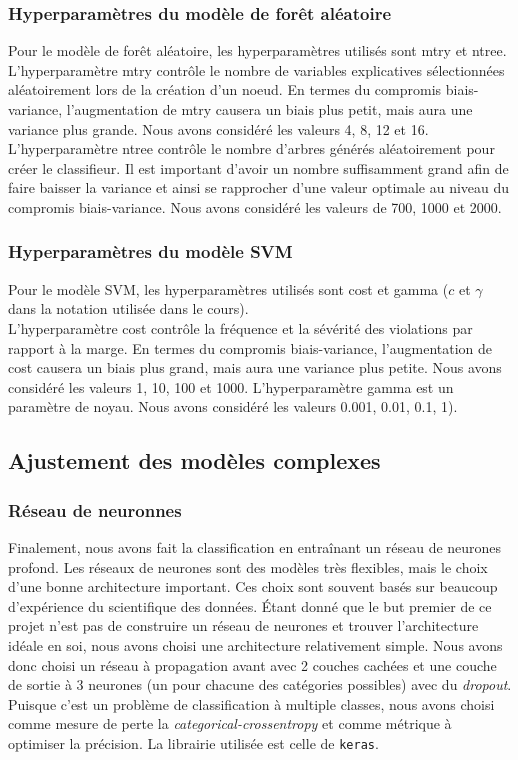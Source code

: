 \subsubsection{Hyperparamètres du modèle de forêt aléatoire}
Pour le modèle de forêt aléatoire, les hyperparamètres utilisés sont mtry et ntree.\\
L'hyperparamètre mtry contrôle le nombre de variables explicatives sélectionnées aléatoirement lors de la création d'un noeud. En termes du compromis biais-variance, l'augmentation de mtry causera un biais plus petit, mais aura une variance plus grande.  Nous avons considéré les valeurs 4, 8, 12 et 16.\\
L'hyperparamètre ntree contrôle le nombre d'arbres générés aléatoirement pour créer le classifieur. Il est important d'avoir un nombre suffisamment grand afin de faire baisser la variance et ainsi se rapprocher d'une valeur optimale au niveau du compromis biais-variance. Nous avons considéré les valeurs de 700, 1000 et 2000.

\subsubsection{Hyperparamètres du modèle SVM}
Pour le modèle SVM, les hyperparamètres utilisés sont cost et gamma ($c$ et $\gamma$ dans la notation utilisée dans le cours).\\
L'hyperparamètre cost contrôle la fréquence et la sévérité des violations par rapport à la marge. En termes du compromis biais-variance, l'augmentation de cost causera un biais plus grand, mais aura une variance plus petite. Nous avons considéré les valeurs 1, 10, 100 et 1000. L'hyperparamètre gamma est un paramètre de noyau. Nous avons considéré les valeurs 0.001, 0.01, 0.1, 1).\\

\subsection{Ajustement des modèles complexes}

\subsubsection{Réseau de neuronnes}

Finalement, nous avons fait la classification en entraînant un réseau de neurones profond. Les réseaux de neurones sont des modèles très flexibles, mais le choix d'une bonne architecture important. Ces choix sont souvent basés sur beaucoup d'expérience du scientifique des données. Étant donné que le but premier de ce projet n'est pas de construire un réseau de neurones et trouver l'architecture idéale en soi, nous avons choisi une architecture relativement simple. Nous avons donc choisi un réseau à propagation avant avec 2 couches cachées et une couche de sortie à 3 neurones (un pour chacune des catégories possibles) avec du \textit{dropout}. Puisque c'est un problème de classification à multiple classes, nous avons choisi comme mesure de perte la \textit{categorical-crossentropy} et comme métrique à optimiser la précision. La librairie utilisée est celle de \texttt{keras}.\\


